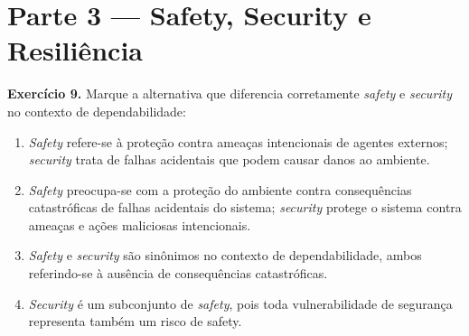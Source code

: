 \documentclass[12pt,a4paper]{article}
\newif\ifgabarito
\newcommand{\R}{\mathrm{R}}
\newcommand{\questao}[2][8]{%
  \needspace{#1\baselineskip}%
  \noindent\textbf{Exercício #2.}%
}
\begin{document}
\ifgabarito
\begin{tcolorbox}[gabarito]
\begin{enumerate}[label=\alph*),nosep]
  \item $\R_A(48) = e^{-48/400} = e^{-0{,}12} \approx \mathbf{88{,}7\%}$; \quad $\R_B(48) = e^{-48/1200} = e^{-0{,}04} \approx \mathbf{96{,}1\%}$.
  \item Ganho: $96{,}1 - 88{,}7 = \mathbf{7{,}4}$ pontos percentuais.
  \item \textbf{Sim, recomenda-se B}: em missão crítica, 7,4 p.p. adicionais de confiabilidade podem evitar falhas cujo custo humano ou operacional supera em muito o custo 3$\times$ maior do componente.
\end{enumerate}
\end{tcolorbox}
\fi

\section{Parte 3 --- Safety, Security e Resiliência}

\questao[12]{9} Marque a alternativa que diferencia corretamente \textit{safety} e \textit{security} no contexto de dependabilidade:
\begin{enumerate}[label=(\Alph*)]
  \item \textit{Safety} refere-se à proteção contra ameaças intencionais de agentes externos; \textit{security} trata de falhas acidentais que podem causar danos ao ambiente.
  \item \textit{Safety} preocupa-se com a proteção do ambiente contra consequências catastróficas de falhas acidentais do sistema; \textit{security} protege o sistema contra ameaças e ações maliciosas intencionais.
  \item \textit{Safety} e \textit{security} são sinônimos no contexto de dependabilidade, ambos referindo-se à ausência de consequências catastróficas.
  \item \textit{Security} é um subconjunto de \textit{safety}, pois toda vulnerabilidade de segurança representa também um risco de safety.
\end{enumerate}

\ifgabarito
\begin{tcolorbox}[gabarito]
Alternativa \textbf{(B)}. A diferença central é a origem da ameaça: \textit{safety} trata de falhas \emph{acidentais} (ex.: bug, falha de hardware) que podem causar danos físicos; \textit{security} trata de ameaças \emph{intencionais} (ex.: atacante, malware). As alternativas A e C invertem ou igualam os conceitos; D é incorreta porque a relação não é de subconjunto.
\end{tcolorbox}
\fi
\end{document}
